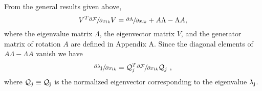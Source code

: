 \documentclass[9pt,lineno]{elife}
\begin{document}
From the general results given above,
\[ V^T \sfrac{\partial {\cal F}}{\partial x_{lk}} V =
\sfrac{\partial \Lambda}{\partial x_{lk}} + A\Lambda - \Lambda A, \]
where the eigenvalue matrix $\Lambda$, the eigenvector matrix $V$, and
the generator matrix of rotation $A$ are defined in Appendix A.
Since the diagonal elements of $A\Lambda - \Lambda A$ vanish we have
\begin{equation}
\label{eq:grad-eval}
 \sfrac{\partial \lambda_{\mbox{\scriptsize{j}}}}{\partial x_{lk}} =
{\cal Q}^T_j \sfrac{\partial {\cal F}}{\partial x_{lk}} 
{\cal Q}_j\ , 
\end{equation} 
where ${\cal Q}_j\equiv {\cal Q}_{\mbox{\scriptsize{j}}}$ is the normalized 
eigenvector corresponding 
to the eigenvalue $\lambda_{\mbox{\scriptsize{j}}}$.
\end{document}
